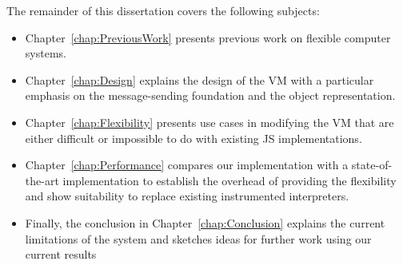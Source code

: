 The remainder of this dissertation covers the following subjects: 
\begin{itemize}
    \item Chapter~\ref{chap:PreviousWork} presents previous work on flexible computer systems.
    \item Chapter~\ref{chap:Design} explains the design of the VM with a
        particular emphasis on the message-sending foundation and the object
        representation.
    \item Chapter~\ref{chap:Flexibility} presents use cases in modifying the VM
        that are either difficult or impossible to do with existing JS
        implementations.
    \item Chapter~\ref{chap:Performance} compares our implementation with a
        state-of-the-art implementation to establish the overhead of providing
        the flexibility and show suitability to replace existing instrumented
        interpreters.
    \item Finally, the conclusion in Chapter~\ref{chap:Conclusion} explains the
        current limitations of the system and sketches ideas for further work
        using our current results
\end{itemize}
